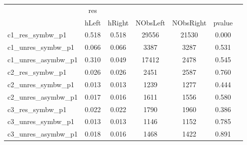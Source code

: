 \begin{tabular}{l*{6}{c}}
\toprule
&res&&&&\\
&hLeft&hRight&NObsLeft&NObsRight&pvalue\\
c1_res_symbw_p1&0.518&0.518&29556&21530&0.000\\
c1_unres_symbw_p1&0.066&0.066&3387&3287&0.531\\
c1_unres_asymbw_p1&0.310&0.049&17412&2478&0.545\\
c2_res_symbw_p1&0.026&0.026&2451&2587&0.760\\
c2_unres_symbw_p1&0.013&0.013&1239&1277&0.444\\
c2_unres_asymbw_p1&0.017&0.016&1611&1556&0.580\\
c3_res_symbw_p1&0.022&0.022&1790&1960&0.386\\
c3_unres_symbw_p1&0.013&0.013&1146&1152&0.785\\
c3_unres_asymbw_p1&0.018&0.016&1468&1422&0.891\\
\bottomrule
\end{tabular}
